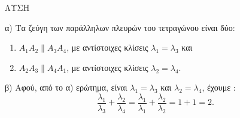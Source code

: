 ΛΥΣΗ

α) Τα ζεύγη των παράλληλων πλευρών του τετραγώνου είναι δύο:
\begin{enumerate}
    \item[(i)] $A_1A_2 \parallel A_3A_4$, με αντίστοιχες κλίσεις $\lambda_1 = \lambda_3$ και
    \item[(ii)] $A_2A_3 \parallel A_4A_1$, με αντίστοιχες κλίσεις $\lambda_2 = \lambda_4$.
\end{enumerate}

β) Αφού, από το α) ερώτημα, είναι $\lambda_1 = \lambda_3$ και $\lambda_2 = \lambda_4$, έχουμε :
\[
    \frac{\lambda_1}{\lambda_3} + \frac{\lambda_2}{\lambda_4} = \frac{\lambda_1}{\lambda_1} + \frac{\lambda_2}{\lambda_2} = 1 + 1 = 2 .
\]